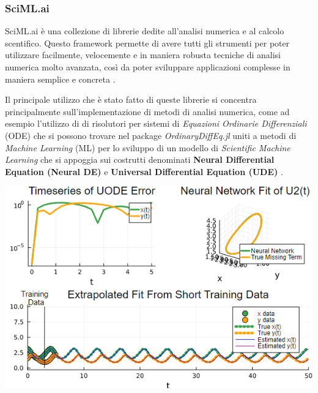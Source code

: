 \subsubsection{SciML.ai}
SciML.ai è una collezione di librerie dedite all'analisi numerica e 
al calcolo scentifico. Questo framework permette di 
avere tutti gli strumenti per poter utilizzare facilmente, 
velocemente e in maniera robusta tecniche di analisi numerica 
molto avanzata, così da poter sviluppare applicazioni complesse 
in maniera semplice e concreta
\cite{rackauckas2017differentialequations} 
\cite{rackauckas2019diffeqflux} 
\cite{rackauckas2020universal}. 

Il principale utilizzo che è stato fatto di queste librerie si 
concentra principalmente sull'implementazione di metodi di analisi 
numerica, come ad esempio l'utilizzo di di risolutori per sistemi 
di \emph{Equazioni Ordinarie Differenziali} (ODE) che si possono 
trovare nel package \emph{OrdinaryDiffEq.jl} \cite{rackauckas2017differentialequations} 
uniti a metodi di \emph{Machine Learning} (ML) \cite{pal2023lux} \cite{Flux.jl-2018} \cite{innes:2018}
per lo sviluppo di un modello di \emph{Scientific Machine Learning} che si 
appoggia sui costrutti denominati \textbf{Neural Differential Equation (Neural DE)}
e \textbf{Universal Differential Equation (UDE)} 
\cite{rackauckas2019diffeqflux} \cite{rackauckas2020universal}. 

\begin{minipage}{\linewidth}
    \centering
    \includegraphics[width=\textwidth]{img/uode_cont.png}
    \label{fig:SciML_example}
\end{minipage}

